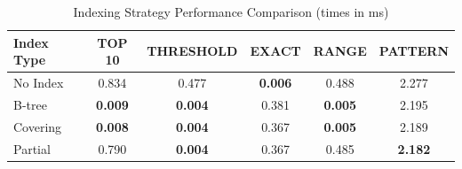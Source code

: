 
\begin{table}[htbp]
\centering
\caption{Indexing Strategy Performance Comparison (times in ms)}
\label{tab:indexing}
\begin{tabular}{lccccc}
\toprule
\textbf{Index Type} & \textbf{TOP 10} & \textbf{THRESHOLD} & \textbf{EXACT} & \textbf{RANGE} & \textbf{PATTERN} \\
\midrule
No Index & 0.834 & 0.477 & \textbf{0.006} & 0.488 & 2.277 \\
B-tree & \textbf{0.009} & \textbf{0.004} & 0.381 & \textbf{0.005} & 2.195 \\
Covering & \textbf{0.008} & \textbf{0.004} & 0.367 & \textbf{0.005} & 2.189 \\
Partial & 0.790 & \textbf{0.004} & 0.367 & 0.485 & \textbf{2.182} \\
\bottomrule
\end{tabular}
\end{table}
